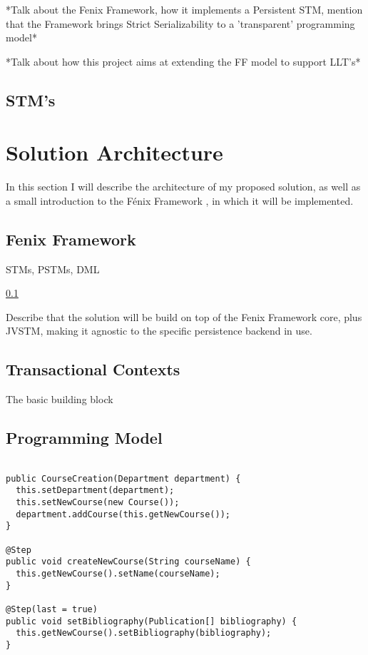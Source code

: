 \documentclass{llncs}
\begin{document}
*Talk about the Fenix Framework, how it implements a Persistent STM,
mention that the Framework brings Strict Serializability to a
'transparent' programming model* \cite{fernandes2011strict} 
\cite{guerraoui2008correctness} \cite{cachopo2006versioned}

*Talk about how this project aims at extending the FF model to support LLT's*

\subsection{STM's}
\label{sec:stm}


\section{Solution Architecture}

In this section I will describe the architecture of my proposed
solution, as well as a small introduction to the Fénix Framework
\cite{fernandes2011strict}, in which it will be implemented.

\subsection{Fenix Framework}

STMs, PSTMs, DML

\ref{sec:stm}

Describe that the solution will be build on top of the Fenix Framework
core, plus JVSTM, making it agnostic to the specific persistence
backend in use. 

\subsection{Transactional Contexts}

The basic building block 

\subsection{Programming Model}

\begin{lstlisting}

public CourseCreation(Department department) {
  this.setDepartment(department);
  this.setNewCourse(new Course());
  department.addCourse(this.getNewCourse());
}

@Step
public void createNewCourse(String courseName) {
  this.getNewCourse().setName(courseName);
}

@Step(last = true)
public void setBibliography(Publication[] bibliography) {
  this.getNewCourse().setBibliography(bibliography);
}
\end{lstlisting}
\end{document}
